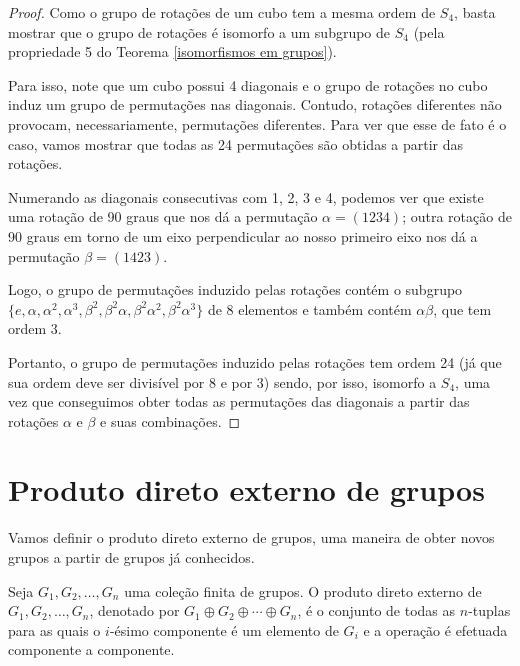 	\begin{proof}
		Como o grupo de rotações de um cubo tem a mesma ordem de $S_4$, basta mostrar que o grupo de rotações é isomorfo a um subgrupo de $S_4$ (pela propriedade 5 do Teorema \eqref{isomorfismos em grupos}). 
		\par\vspace{0.3cm} Para isso, note que um cubo possui 4 diagonais e o grupo de rotações no cubo induz um grupo de permutações nas diagonais. Contudo, rotações diferentes não provocam, necessariamente, permutações diferentes. Para ver que esse de fato é o caso, vamos mostrar que todas as 24 permutações são obtidas a partir das rotações.
		\par\vspace{0.3cm} Numerando as diagonais consecutivas com 1, 2, 3 e 4, podemos ver que existe uma rotação de 90 graus que nos dá a permutação $\alpha = (1234)$; outra rotação de 90 graus em torno de um eixo perpendicular ao nosso primeiro eixo nos dá a permutação $\beta = (1423)$.
		\par\vspace{0.3cm} Logo, o grupo de permutações induzido pelas rotações contém o subgrupo \\$\{e, \alpha, \alpha^2, \alpha^3, \beta^2, \beta^2\alpha, \beta^2\alpha^2, \beta^2\alpha^3\}$ de 8 elementos e também contém $\alpha\beta$, que tem ordem 3. 
		\par\vspace{0.3cm} Portanto, o grupo de permutações induzido pelas rotações tem ordem 24 (já que sua ordem deve ser divisível por 8 e por 3) sendo, por isso, isomorfo a $S_4$, uma vez que conseguimos obter todas as permutações das diagonais a partir das rotações $\alpha$ e $\beta$ e suas combinações. 
		
	\end{proof}

\section{Produto direto externo de grupos}
\label{sec-prod-direto-grupos}

    \hspace{12pt} Vamos definir o produto direto externo de grupos, uma maneira de obter novos grupos a partir de grupos já conhecidos.
	\begin{deff}
		\label{def prod direto externo}
		Seja $G_1, G_2, \dots, G_n$ uma coleção finita de grupos. O produto direto externo de $G_1, G_2, \dots, G_n$, denotado por $\displaystyle{G_1\oplus G_2\oplus\cdots\oplus G_n}$, é o conjunto de todas as $n$-tuplas para as quais o $i$-ésimo componente é um elemento de $G_i$ e a operação é efetuada componente a componente.
	\end{deff}
	
